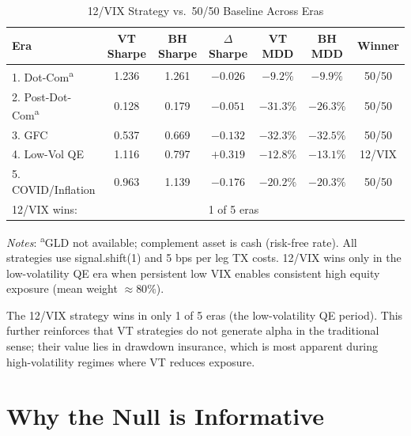 \documentclass[12pt,a4paper]{article}
\begin{document}
\begin{table}[H]
\centering
\small
\begin{threeparttable}
\caption{12/VIX Strategy vs.\ 50/50 Baseline Across Eras}
\label{tab:strategy_eras}
\begin{tabular}{@{}lcccccc@{}}
\toprule
Era & VT Sharpe & BH Sharpe & $\Delta$Sharpe & VT MDD & BH MDD & Winner \\
\midrule
1. Dot-Com\textsuperscript{a} & 1.236 & 1.261 & $-0.026$ & $-9.2\%$ & $-9.9\%$ & 50/50 \\
2. Post-Dot-Com\textsuperscript{a} & 0.128 & 0.179 & $-0.051$ & $-31.3\%$ & $-26.3\%$ & 50/50 \\
3. GFC & 0.537 & 0.669 & $-0.132$ & $-32.3\%$ & $-32.5\%$ & 50/50 \\
4. Low-Vol QE & 1.116 & 0.797 & $+0.319$ & $-12.8\%$ & $-13.1\%$ & 12/VIX \\
5. COVID/Inflation & 0.963 & 1.139 & $-0.176$ & $-20.2\%$ & $-20.3\%$ & 50/50 \\
\midrule
\multicolumn{3}{l}{12/VIX wins:} & \multicolumn{4}{l}{1 of 5 eras} \\
\bottomrule
\end{tabular}
\begin{tablenotes}
\small
\item \textit{Notes}: \textsuperscript{a}GLD not available; complement asset is cash (risk-free rate). All strategies use signal.shift(1) and 5 bps per leg TX costs. 12/VIX wins only in the low-volatility QE era when persistent low VIX enables consistent high equity exposure (mean weight $\approx 80\%$).
\end{tablenotes}
\end{threeparttable}
\end{table}

The 12/VIX strategy wins in only 1 of 5 eras (the low-volatility QE period). This further reinforces that VT strategies do not generate alpha in the traditional sense; their value lies in drawdown insurance, which is most apparent during high-volatility regimes where VT reduces exposure.


\section{Why the Null is Informative}
\label{sec:null}
\end{document}
